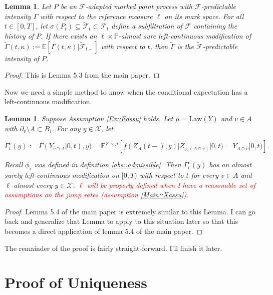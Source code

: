 \documentclass[12pt]{article}
\newcommand{\mb}{\mathbb}
\newcommand{\mc}{\mathcal}
\newcommand{\ov}{\overline}
\newcommand{\te}{\text}
\newcommand{\tr}{\textcolor{red}}
\newcommand{\pr}{\mb{P}}							%
\newcommand{\ex}[1]{\mb{E}\left[#1\right]}			%
\newcommand{\exmu}[2]{\mb{E}^{#1}\left[#2\right]}	%
\newcommand{\sta}{\mc{X}}							%
\newcommand{\neigh}[1]{\partial_{#1}}				%
\newcommand{\cl}[1]{\ov{#1}}						%
\newcommand{\F}{\mc{F}}								%
\newcommand{\vind}[1]{_{#1}}						%
\newcommand{\tme}[1]{(#1)}							%
\newcommand{\tmi}[1]{#1}							%
\renewcommand{\mark}{\kappa}
\newcommand{\Xg}{Y}
\newcommand{\ratee}{\Gamma}
\newcommand{\rp}{P}
\newcommand{\alt}[1]{\tilde{#1}}
\newcommand{\cratee}{\alt{\ratee}}
\newcommand{\law}{\te{Law}}
\newcommand{\Xh}{Z}
\newtheorem{lem}[thms]{Lemma}
\begin{document}
\begin{lem}
Let \(\rp\) be an \(\F\)-adapted marked point process with \(\F\)-predictable intensity \(\ratee\) with respect to the reference measure \(\ell\) on its mark space. For all \(t \in [0,T]\), let \(\sigma(\rp_{t}) \subseteq \alt{\F}_{t}\subset \F_{t}\) define a subfiltration of \(\F\) containing the history of \(\rp\). If there exists an \(\ell\times \pr\)-almost sure left-continuous modification of \(\cratee(t,\mark) := \ex{\ratee(t,\mark)|\alt{\F}_{t-}}\) with respect to \(t\), then \(\cratee\) is the \(\alt{\F}\)-predictable intensity of \(\rp\).
\label{Ex::filtering}
\end{lem}

\begin{proof}
This is Lemma 5.3 from the main paper.
\end{proof}

Now we need a simple method to know when the conditional expectation has a left-continuous modification.


\begin{lem}
Suppose Assumption \ref{Ex::Eassu} holds. Let \(\mu = \law(\Xg)\) and \(v \in A\) with \(\neigh{v}\setminus A \subset B_i\). For any \(y \in \sta\), let

\[\ratee^{v}_{t}(y) := \ratee(\Xg\vind{\cl{v}\cap A}\tmi{[0,t)},y) = \exmu{\Xh\sim \mu}{f(\Xh\vind{A}\tme{t-},y)|\Xh\vind{\phi_i(A\cap\cl{v})}\tmi{[0,t)} = \Xg\vind{A\cap\cl{v}}\tmi{[0,t)}}.\]

Recall \(\phi_i\) was defined in definition \ref{abs::admissible}. Then \(\ratee^{v}_{t}(y)\) has an almost surely left-continuous modification on \([0,T)\) with respect to \(t\) for every \(v \in A\) and \(\ell\)-almost every \(y \in \sta\). \tr{\(\ell\) will be properly defined when I have a reasonable set of assumptions on the jump rates (assumption \ref{Main::Xassu})}.
\label{Ex::leftmod}
\end{lem}
\begin{proof}
Lemma 5.4 of the main paper is extremely similar to this Lemma. I can go back and generalize that Lemma to apply to this situation later so that this becomes a direct application of lemma 5.4 of the main paper.
\end{proof}
The remainder of the proof is fairly straight-forward. I'll finish it later.

\section{Proof of Uniqueness}
\end{document}
